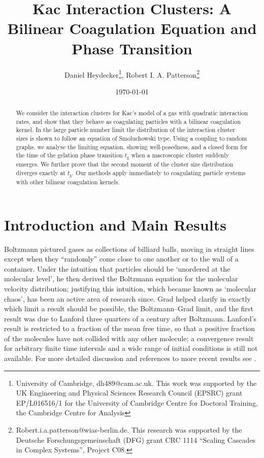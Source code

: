 \documentclass[11pt, notitlepage]{article}
\title{Kac Interaction Clusters: A Bilinear Coagulation Equation and Phase Transition}
\author{Daniel Heydecker\thanks{University of Cambridge, dh489@cam.ac.uk. This work was supported by the UK Engineering and Physical Sciences Research Council (EPSRC) grant EP/L016516/1 for the University of Cambridge Centre for Doctoral Training, the Cambridge Centre for Analysis}, Robert I. A. Patterson\thanks{Robert.i.a.patterson@wias-berlin.de. This research was supported by the Deutsche Forschungsgemeinschaft (DFG) grant CRC 1114 ``Scaling Cascades in Complex Systems'', Project C08.}}
\date{\today}
\begin{document}
\maketitle
\begin{abstract} We consider the interaction clusters for Kac's model of a gas with quadratic interaction rates, and show that they behave as coagulating particles with a bilinear coagulation kernel.
In the large particle number limit the distribution of the interaction cluster sizes is shown to follow an equation of Smoluchowski type.
Using a coupling to random graphs, we analyse the limiting equation, showing well-posedness, and a closed form for the time of the gelation phase transition $t_\mathrm{g}$ when a macroscopic cluster suddenly emerges.
We further prove that the second moment of the cluster size distribution diverges exactly at $t_\mathrm{g}.$
Our methods apply immediately to coagulating particle systems with other bilinear coagulation kernels.
\end{abstract}


\section{Introduction and Main Results}

Boltzmann \cite{B96} pictured gases as collections of  billiard balls, moving in straight lines except when they ``randomly'' come close to one another or to the wall of a container. 
Under the intuition that particles should be `unordered at the molecular level', he then derived the Boltzmann equation for the molecular velocity distribution; justifying this intuition, which became known as `molecular chaos', has been an active area of research since. 
Grad helped clarify in exactly which limit a result should be possible, the Boltzmann--Grad limit, and the first result was due to Lanford \cite{L75} three quarters of a century after Boltzmann.
Lanford's result is restricted to a fraction of the mean free time, so that a positive fraction of the molecules have not collided with any other molecule; a convergence result for arbitrary finite time intervals and a wide range of initial conditions is still not available. For more detailed discussion and references to more recent results see \cite{PS17}.
\end{document}
